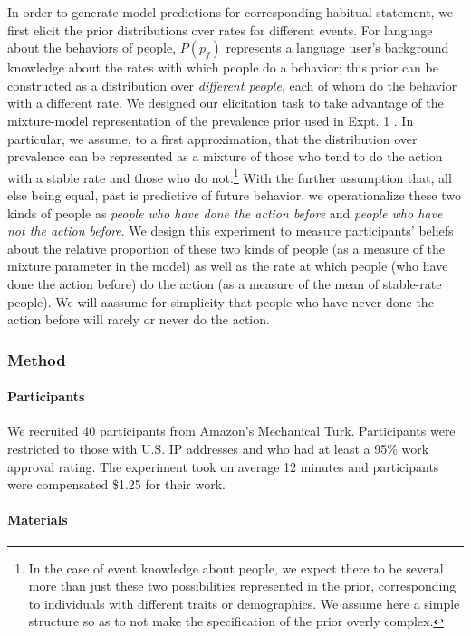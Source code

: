 \documentclass[english,floatsintext,man]{apa6}
\theoremstyle{definition}
\theoremstyle{definition}
\theoremstyle{definition}
\theoremstyle{remark}
\begin{document}
In order to generate model predictions for corresponding habitual
statement, we first elicit the prior distributions over rates for
different events. For language about the behaviors of people, \(P(p_f)\)
represents a language user's background knowledge about the rates with
which people do a behavior; this prior can be constructed as a
distribution over \emph{different people}, each of whom do the behavior
with a different rate. We designed our elicitation task to take
advantage of the mixture-model representation of the prevalence prior
used in Expt. 1 . In particular, we assume, to a first approximation,
that the distribution over prevalence can be represented as a mixture of
those who tend to do the action with a stable rate and those who do
not.\footnote{In the case of event knowledge about people, we expect
  there to be several more than just these two possibilities represented
  in the prior, corresponding to individuals with different traits or
  demographics. We assume here a simple structure so as to not make the
  specification of the prior overly complex.} With the further
assumption that, all else being equal, past is predictive of future
behavior, we operationalize these two kinds of people as \emph{people
who have done the action before} and \emph{people who have not the
action before}. We design this experiment to measure participants'
beliefs about the relative proportion of these two kinds of people (as a
measure of the mixture parameter in the model) as well as the rate at
which people (who have done the action before) do the action (as a
measure of the mean of stable-rate people). We will aassume for
simplicity that people who have never done the action before will rarely
or never do the action.

\subsubsection{Method}\label{method-2}

\paragraph{Participants}\label{participants-2}

We recruited 40 participants from Amazon's Mechanical Turk. Participants
were restricted to those with U.S. IP addresses and who had at least a
95\% work approval rating. The experiment took on average 12 minutes and
participants were compensated \$1.25 for their work.

\paragraph{Materials}\label{materials}
\end{document}
